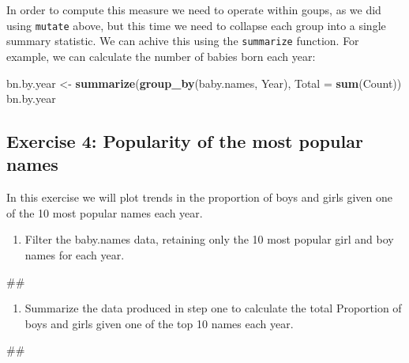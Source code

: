 \documentclass[]{book}
\newenvironment{Shaded}{\begin{snugshade}}{\end{snugshade}}
\newcommand{\KeywordTok}[1]{\textcolor[rgb]{0.13,0.29,0.53}{\textbf{#1}}}
\newcommand{\DataTypeTok}[1]{\textcolor[rgb]{0.13,0.29,0.53}{#1}}
\newcommand{\StringTok}[1]{\textcolor[rgb]{0.31,0.60,0.02}{#1}}
\newcommand{\NormalTok}[1]{#1}
\providecommand{\tightlist}{%
  \setlength{\itemsep}{0pt}\setlength{\parskip}{0pt}}
\begin{document}
In order to compute this measure we need to operate within goups, as we
did using \texttt{mutate} above, but this time we need to collapse each
group into a single summary statistic. We can achive this using the
\texttt{summarize} function. For example, we can calculate the number of
babies born each year:

\begin{Shaded}
\begin{Highlighting}[]
\NormalTok{bn.by.year <-}\StringTok{ }\KeywordTok{summarize}\NormalTok{(}\KeywordTok{group_by}\NormalTok{(baby.names, Year),}
                       \DataTypeTok{Total =} \KeywordTok{sum}\NormalTok{(Count))}
\NormalTok{bn.by.year}
\end{Highlighting}
\end{Shaded}

\subsection{Exercise 4: Popularity of the most popular
names}\label{exercise-4-popularity-of-the-most-popular-names}

In this exercise we will plot trends in the proportion of boys and girls
given one of the 10 most popular names each year.

\begin{enumerate}
\def\labelenumi{\arabic{enumi}.}
\tightlist
\item
  Filter the baby.names data, retaining only the 10 most popular girl
  and boy names for each year.
\end{enumerate}

\begin{Shaded}
\begin{Highlighting}[]
\NormalTok{##}
\end{Highlighting}
\end{Shaded}

\begin{enumerate}
\def\labelenumi{\arabic{enumi}.}
\setcounter{enumi}{1}
\tightlist
\item
  Summarize the data produced in step one to calculate the total
  Proportion of boys and girls given one of the top 10 names each year.
\end{enumerate}

\begin{Shaded}
\begin{Highlighting}[]
\NormalTok{##}
\end{Highlighting}
\end{Shaded}
\end{document}
